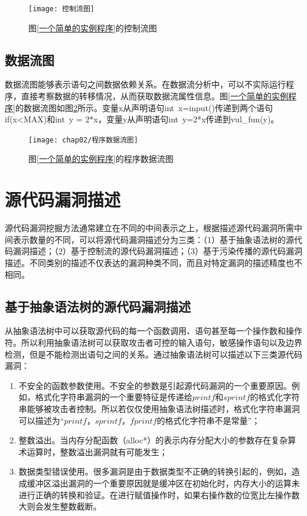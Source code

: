 \begin{figure}[htp]
\centering
\texttt{[image: 控制流图]}
\caption{图\ref{一个简单的实例程序}的控制流图}
\label{控制流图}
\end{figure}

\subsection{数据流图}

数据流图能够表示语句之间数据依赖关系。在数据流分析中，可以不实际运行程序，直接考察数据的转移情况，从而获取数据流属性信息。图\ref{一个简单的实例程序}的数据流图如图\ref{程序数据流图}所示。变量x从声明语句int\ x=input()传递到两个语句if(x<MAX)和int\ y = 2*x，变量y从声明语句int\ y=2*x传递到vul\_fun(y)。

\begin{figure}[htp]
\centering
\texttt{[image: chap02/程序数据流图]}
\caption{图\ref{一个简单的实例程序}的程序数据流图}
\label{程序数据流图}
\end{figure}

\section{源代码漏洞描述}

源代码漏洞挖掘方法通常建立在不同的中间表示之上，根据描述源代码漏洞所需中间表示数量的不同，可以将源代码漏洞描述分为三类：（1）基于抽象语法树的源代码漏洞描述；（2）基于控制流的源代码漏洞描述；（3）基于污染传播的源代码漏洞描述。不同类别的描述不仅表达的漏洞种类不同，而且对特定漏洞的描述精度也不相同。

\subsection{基于抽象语法树的源代码漏洞描述}

从抽象语法树中可以获取源代码的每一个函数调用、语句甚至每一个操作数和操作符。所以利用抽象语法树可以获取攻击者可控的输入语句，敏感操作语句以及边界检测，但是不能检测出语句之间的关系。通过抽象语法树可以描述以下三类源代码漏洞：

\begin{enumerate}[(1)]
\item 不安全的函数参数使用。不安全的参数是引起源代码漏洞的一个重要原因。例如，格式化字符串漏洞的一个重要特征是传递给$printf$和$sprintf$的格式化字符串能够被攻击者控制。所以若仅仅使用抽象语法树描述时，格式化字符串漏洞可以描述为“$printf$，$sprintf$，$fprintf$的格式化字符串不是常量”；
\item 整数溢出。当内存分配函数（alloc*）的表示内存分配大小的参数存在复杂算术运算时，整数溢出漏洞就有可能发生；
\item 数据类型错误使用。很多漏洞是由于数据类型不正确的转换引起的，例如，造成缓冲区溢出漏洞的一个重要原因就是缓冲区在初始化时，内存大小的运算未进行正确的转换和验证。在进行赋值操作时，如果右操作数的位宽比左操作数大则会发生整数截断。
\end{enumerate}

